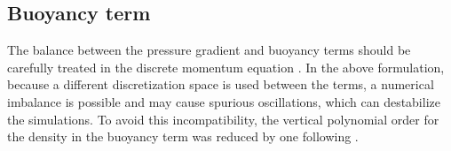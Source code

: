 \subsection{Buoyancy term}
The balance between the pressure gradient and buoyancy terms should be carefully treated  
in the discrete momentum equation \citep[e.g.,][]{Blaise2016StablizationDG,ORGIS2017461}. 
In the above formulation, 
because a different discretization space is used between the terms, 
a numerical imbalance is possible and may cause spurious oscillations, which can destabilize the simulations. 
To avoid this incompatibility, 
the vertical polynomial order for the density in the buoyancy term was reduced by one 
following \cite{Blaise2016StablizationDG}. 
